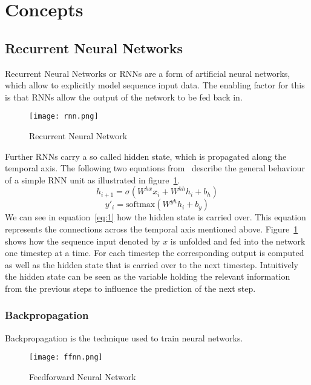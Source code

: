 \section{Concepts}
\subsection{Recurrent Neural Networks}\label{rnn}
Recurrent Neural Networks or RNNs are a form of artificial neural networks, which allow to explicitly model sequence input data.
The enabling factor for this is that RNNs allow the output of the network to be fed back in.

\begin{figure}[ht]
	\centering
	\captionsetup{width=0.8\textwidth}
    \texttt{[image: rnn.png]}
    \caption{Recurrent Neural Network}
    \label{fig:rnn}
\end{figure}

Further RNNs carry a so called hidden state, which is propagated along the temporal axis.
The following two equations from~\cite{rnn_survey} describe the general behaviour of a simple RNN unit as illustrated in figure~\ref{fig:rnn}.
\begin{equation}\label{eq:1}
    h_{i+1} = \sigma(W^{hx}x_i + W^{hh}h_i + b_h)
\end{equation}
\begin{equation}\label{eq:2}
    y'_i = \text{softmax}(W^{yh}h_i + b_y)
\end{equation}
We can see in equation~\ref{eq:1} how the hidden state is carried over.
This equation represents the connections across the temporal axis mentioned above.
Figure~\ref{fig:rnn} shows how the sequence input denoted by $x$ is unfolded and fed into the network one timestep at a time.
For each timestep the corresponding output is computed as well as the hidden state that is carried over to the next timestep.
Intuitively the hidden state can be seen as the variable holding the relevant information from the previous steps to influence the prediction of the next step.
\subsubsection{Backpropagation}
Backpropagation is the technique used to train neural networks.

\begin{figure}[ht]
	\centering
	\captionsetup{width=0.8\textwidth}
    \texttt{[image: ffnn.png]}
    \caption{Feedforward Neural Network}
    \label{fig:ffnn}
\end{figure}

